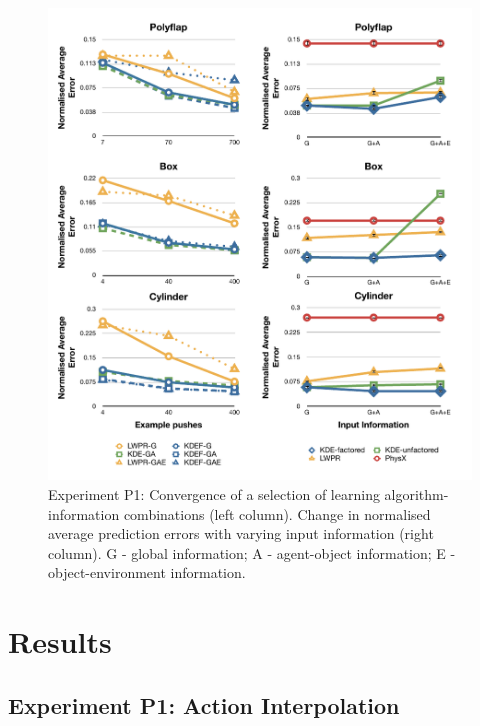 \begin{figure}[t]
\centerline{
\includegraphics[width=\columnwidth]{graphs_jw/P1-graphs}
}
\vspace{-1mm}
\caption{Experiment P1: Convergence of a selection of learning
  algorithm-information combinations (left column). Change in normalised average prediction errors with varying input information (right column). G - global information; A - agent-object information; E - object-environment information.}
\label{fig:Lgraphs}
\end{figure}


\section{Results}\label{sec:Results}

\subsection{Experiment P1: Action Interpolation}\label{sec:Results.Learning}

